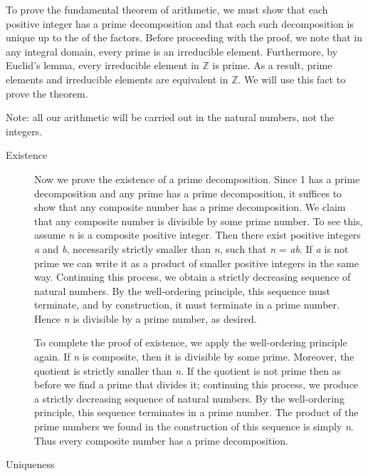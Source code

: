 \documentclass[12pt]{article}
\newcommand{\fm}[1]{{\it #1}}
\begin{document}
To prove the fundamental theorem of arithmetic, we must show that each
positive integer has a prime decomposition and that each such
decomposition is unique up to the  of the factors.  Before
proceeding with the proof, we note that in any integral domain, every
prime is an irreducible element.  Furthermore, by Euclid's lemma, every irreducible element in $\mathbb{Z}$ is prime.  As a result, prime elements and irreducible elements are equivalent in $\mathbb{Z}$.  We will use this fact to prove the theorem.

Note: all our arithmetic will be carried out in the natural numbers, not the integers.

\begin{description}
\item[Existence]

Now we prove the existence of a prime decomposition.  Since 1 has a
prime decomposition and any prime has a prime decomposition, it
suffices to show that any composite number has a prime decomposition.
We claim that any composite number is divisible by some prime number.
To see this, assume \fm{n} is a composite positive integer.  Then
there exist positive integers \fm{a} and \fm{b}, necessarily strictly
smaller than \fm{n}, such that \fm{n} = \fm{ab}.  If \fm{a} is not
prime we can write it as a product of smaller positive integers in the
same way.  Continuing this process, we obtain a strictly decreasing
sequence of natural numbers.  By the well-ordering principle, this
sequence must terminate, and by construction, it must terminate in a
prime number.  Hence \fm{n} is divisible by a prime number, as
desired.

To complete the proof of existence, we apply the well-ordering
principle again.  If \fm{n} is composite, then it is divisible by some
prime.  Moreover, the quotient is strictly smaller than \fm{n}.  If
the quotient is not prime then as before we find a prime that divides
it; continuing this process, we produce a strictly decreasing sequence
of natural numbers.  By the well-ordering principle, this sequence
terminates in a prime number.  The product of the prime numbers we
found in the construction of this sequence is simply \fm{n}.  Thus
every composite number has a prime decomposition.

\item[Uniqueness]


\end{description}
\end{document}
